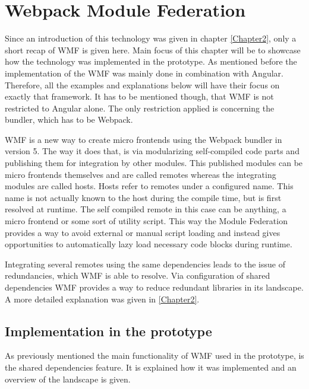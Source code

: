\chapter{Webpack Module Federation} %
\label{Chapter5}


Since an introduction of this technology was given in chapter \ref{Chapter2}, only a short recap of WMF is given here. Main focus of this chapter will be to showcase how the technology was implemented in the prototype. As mentioned before the implementation of the WMF was mainly done in combination with Angular. Therefore, all the examples and explanations below will have their focus on exactly that framework. It has to be mentioned though, that WMF is not restricted to Angular alone. The only restriction applied is concerning the bundler, which has to be Webpack.\cite{wmf_concepts}

WMF is a new way to create micro frontends using the Webpack bundler in version 5. The way it does that, is via modularizing self-compiled code parts and publishing them for integration by other modules. This published modules can be micro frontends themselves and are called remotes whereas the integrating modules are called hosts. 
Hosts refer to remotes under a configured name. This name is not actually known to the host during the compile time, but is first resolved at runtime.
The self compiled remote in this case can be anything, a micro frontend or some sort of utility script. This way the Module Federation provides a way to avoid external or manual script loading and instead gives opportunities to automatically lazy load necessary code blocks during runtime.\cite{wmf_concepts}

Integrating several remotes using the same dependencies leads to the issue of redundancies, which WMF is able to resolve. Via configuration of shared dependencies WMF provides a way to reduce redundant libraries in its landscape. A more detailed explanation was given in \ref{Chapter2}.

\section{Implementation in the prototype}

As previously mentioned the main functionality of WMF used in the prototype, is the shared dependencies feature. It is explained how it was implemented and an overview of the landscape is given.

